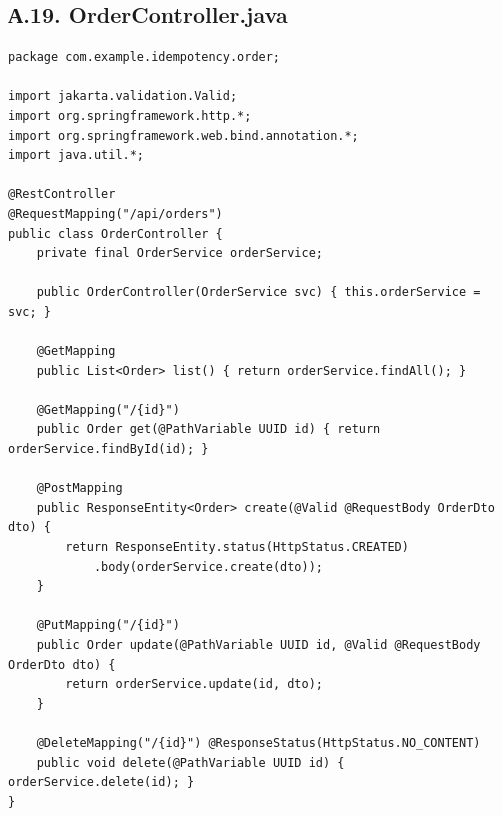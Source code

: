 \subsection*{А.19. OrderController.java}
\begin{lstlisting}[caption={OrderController.java --- тип контроллера \textnumero 1: @RestController}]
package com.example.idempotency.order;

import jakarta.validation.Valid;
import org.springframework.http.*;
import org.springframework.web.bind.annotation.*;
import java.util.*;

@RestController
@RequestMapping("/api/orders")
public class OrderController {
    private final OrderService orderService;

    public OrderController(OrderService svc) { this.orderService = svc; }

    @GetMapping
    public List<Order> list() { return orderService.findAll(); }

    @GetMapping("/{id}")
    public Order get(@PathVariable UUID id) { return orderService.findById(id); }

    @PostMapping
    public ResponseEntity<Order> create(@Valid @RequestBody OrderDto dto) {
        return ResponseEntity.status(HttpStatus.CREATED)
            .body(orderService.create(dto));
    }

    @PutMapping("/{id}")
    public Order update(@PathVariable UUID id, @Valid @RequestBody OrderDto dto) {
        return orderService.update(id, dto);
    }

    @DeleteMapping("/{id}") @ResponseStatus(HttpStatus.NO_CONTENT)
    public void delete(@PathVariable UUID id) { orderService.delete(id); }
}
\end{lstlisting}


